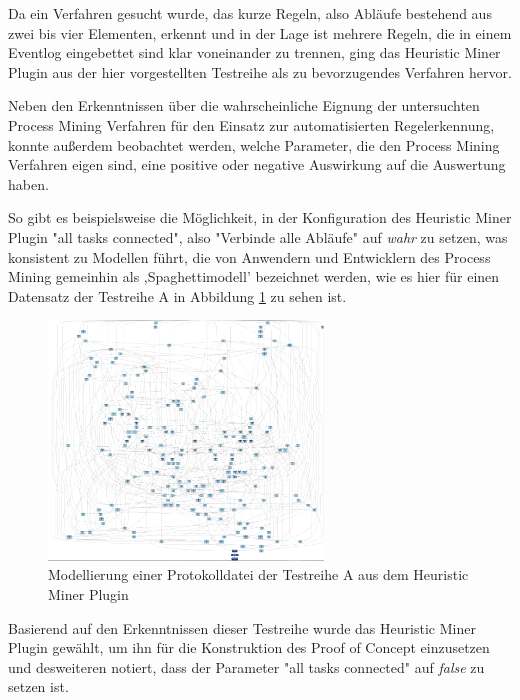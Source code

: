Da ein Verfahren gesucht wurde, das kurze Regeln, also Abläufe bestehend aus zwei bis vier Elementen, erkennt und in der Lage ist mehrere Regeln, die in einem Eventlog eingebettet sind klar voneinander zu trennen, ging das Heuristic Miner Plugin aus der hier vorgestellten Testreihe als zu bevorzugendes Verfahren hervor.

Neben den Erkenntnissen über die wahrscheinliche Eignung der untersuchten Process Mining Verfahren für den Einsatz zur automatisierten Regelerkennung, konnte außerdem beobachtet werden, welche Parameter, die den Process Mining Verfahren eigen sind, eine positive oder negative Auswirkung auf die Auswertung haben. 

So gibt es beispielsweise die Möglichkeit, in der Konfiguration des Heuristic Miner Plugin "all tasks connected", also "Verbinde alle Abläufe" auf \textit{wahr} zu setzen, was konsistent zu Modellen führt, die von Anwendern und Entwicklern des Process Mining gemeinhin als ,Spaghettimodell' bezeichnet werden, wie es hier für einen Datensatz der Testreihe A in Abbildung \ref{fig:A_heuristic_spagh} zu sehen ist.
\begin{figure}[!ht]
    \centering
    \includegraphics[width=0.65\textwidth,]{figures/Appbildungen/A_underfitted.PNG}
    \caption{Modellierung einer Protokolldatei der Testreihe A aus dem Heuristic Miner Plugin}
    \label{fig:A_heuristic_spagh}
\end{figure}

Basierend auf den Erkenntnissen dieser Testreihe wurde das Heuristic Miner Plugin gewählt, um ihn für die Konstruktion des Proof of Concept einzusetzen und desweiteren notiert, dass der Parameter "all tasks connected" auf \textit{false} zu setzen ist.





